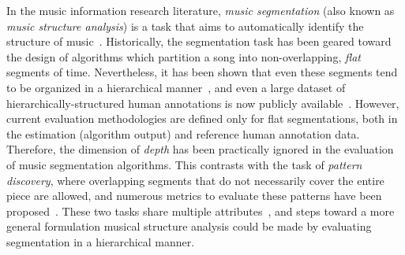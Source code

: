 \documentclass{article}
\begin{document}
In the music information research literature, \emph{music segmentation} (also known as \emph{music structure analysis}) is a task that aims to automatically identify the structure of music~\cite{Paulus2010}.
Historically, the segmentation task has been geared toward the design of algorithms which partition a song into non-overlapping, \emph{flat} segments of time.
Nevertheless, it has been shown that even these segments tend to be organized in a hierarchical manner~\cite{Peeters2009}, and even a large dataset of hierarchically-structured human annotations is now publicly available~\cite{Smith2011}.
However, current evaluation methodologies are defined only for flat segmentations, both in the estimation (algorithm output) and reference human annotation data.
Therefore, the dimension of \emph{depth} has been practically ignored in the evaluation of music segmentation algorithms.
This contrasts with the task of \emph{pattern discovery}, where overlapping segments that do not necessarily cover the entire piece are allowed, and numerous metrics to evaluate these patterns have been proposed~\cite{Collins2013}.
These two tasks share multiple attributes~\cite{Nieto2014_Motives}, and steps toward a more general formulation musical structure analysis could be made by evaluating segmentation in 
a hierarchical manner.

\end{document}

